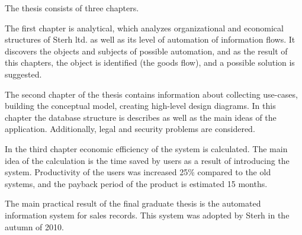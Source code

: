 \documentclass[a4paper, 12pt]{article}
\begin{document}
The thesis consists of three chapters.

The first chapter is analytical, which analyzes organizational and economical structures of Sterh ltd. as well as its level of automation of information flows. It discovers  the objects and subjects of possible automation, and as the result of this chapters, the object is identified (the goods flow), and a possible solution is suggested.

The second chapter of the thesis contains information about collecting use-cases, building the conceptual model, creating high-level design diagrams. In this chapter the database structure is describes as well as the main ideas of the application. Additionally, legal and security problems are considered.

In the third chapter economic efficiency of the system is calculated. The main idea of the calculation is the time saved by users as a result of introducing the system. Productivity of the users was increased 25\% compared to the old systems, and the payback period of the product is estimated 15 months.

The main practical result of the final graduate thesis is the automated information system for sales records. This system was adopted by Sterh in the autumn of 2010.
\end{document}
